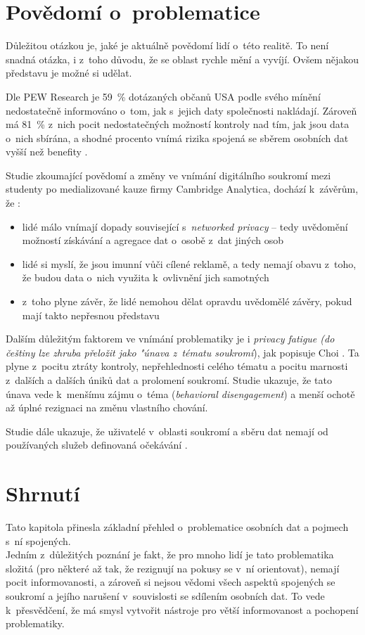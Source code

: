 \section{Povědomí o~problematice}

Důležitou otázkou je, jaké je aktuálně povědomí lidí o~této realitě. To není snadná otázka, i z~toho důvodu, že se oblast rychle mění a vyvíjí. Ovšem nějakou představu je možné si udělat.

Dle PEW Research je 59~\% dotázaných občanů USA podle svého mínění nedostatečně informováno o~tom, jak s~jejich daty společnosti nakládají.
Zároveň má 81~\% z~nich pocit nedostatečných možností kontroly nad tím, jak jsou data o~nich sbírána, a shodné procento vnímá rizika spojená se sběrem osobních dat vyšší než benefity \citep{lack-of-control}.

Studie zkoumající povědomí a změny ve vnímání digitálního soukromí mezi studenty po medializované kauze firmy Cambridge Analytica, dochází k~závěrům, že \citep{privacy-awareness}:

\begin{itemize}
	\item lidé málo vnímají dopady související s~\textit{networked privacy} -- tedy uvědomění možností získávání a agregace dat o~osobě z~dat jiných osob
	\item lidé si myslí, že jsou imunní vůči cílené reklamě, a tedy nemají obavu z~toho, že budou data o~nich využita k~ovlivnění jich samotných
	\item z~toho plyne závěr, že lidé nemohou dělat opravdu uvědomělé závěry, pokud mají takto nepřesnou představu
\end{itemize}

Dalším důležitým faktorem ve vnímání problematiky je i \textit{privacy fatigue (do češtiny lze zhruba přeložit jako "únava z~tématu soukromí}), jak popisuje Choi \citep{privacy-fatigue}. Ta plyne z~pocitu ztráty kontroly, nepřehlednosti celého tématu a pocitu marnosti z~dalších a dalších úniků dat a prolomení soukromí. Studie ukazuje, že tato únava vede k~menšímu zájmu o~téma (\textit{behavioral disengagement}) a menší ochotě až úplné rezignaci na změnu vlastního chování.

Studie dále ukazuje, že uživatelé v~oblasti soukromí a sběru dat nemají od používaných služeb definovaná očekávání \citep{user-privacy-expectations}.


\section*{Shrnutí}
Tato kapitola přinesla základní přehled o~problematice osobních dat a pojmech s~ní spojených.\\
Jedním z~důležitých poznání je fakt, že pro mnoho lidí je tato problematika složitá (pro některé až tak, že rezignují na pokusy se v~ní orientovat), nemají pocit informovanosti, a zároveň si nejsou vědomi všech aspektů spojených se soukromí a jejího narušení v~souvislosti se sdílením osobních dat. To vede k~přesvědčení, že má smysl vytvořit nástroje pro větší informovanost a pochopení problematiky.